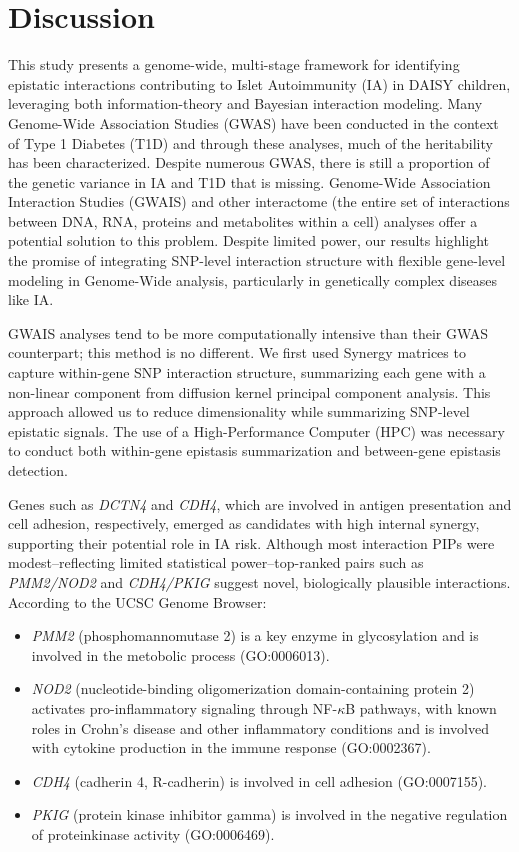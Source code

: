 \documentclass{article}\usepackage[]{graphicx}\usepackage[]{color}
\begin{document}
\section{Discussion}
\label{sec:disc}
This study presents a genome-wide, multi-stage framework for identifying epistatic interactions contributing to Islet Autoimmunity (IA) in DAISY children, leveraging both information-theory and Bayesian interaction modeling. Many Genome-Wide Association Studies (GWAS) have been conducted in the context of Type 1 Diabetes (T1D) and through these analyses, much of the heritability has been characterized. Despite numerous GWAS, there is still a proportion of the genetic variance in IA and T1D that is missing\cite{pangMissingHeritabilityType2022}. Genome-Wide Association Interaction Studies (GWAIS) and other interactome (the entire set of interactions between DNA, RNA, proteins and metabolites within a cell\cite{walakiraDetectingGeneGene2022}) analyses offer a potential solution to this problem. Despite limited power, our results highlight the promise of integrating SNP-level interaction structure with flexible gene-level modeling in Genome-Wide analysis, particularly in genetically complex diseases like IA. 
\par
GWAIS analyses tend to be more computationally intensive than their GWAS counterpart; this method is no different. We first used Synergy matrices to capture within-gene SNP interaction structure, summarizing each gene with a non-linear component from diffusion kernel principal component analysis. This approach allowed us to reduce dimensionality while summarizing SNP-level epistatic signals. The use of a High-Performance Computer (HPC) was necessary to conduct both within-gene epistasis summarization and between-gene epistasis detection. 
\par
Genes such as \textit{DCTN4} and \textit{CDH4}, which are involved in antigen presentation and cell adhesion, respectively, emerged as candidates with high internal synergy, supporting their potential role in IA risk. Although most interaction PIPs were modest--reflecting limited statistical power--top-ranked pairs such as \textit{PMM2/NOD2} and \textit{CDH4/PKIG} suggest novel, biologically plausible interactions. According to the UCSC Genome Browser:
\begin{itemize}
\item \textit{PMM2} (phosphomannomutase 2) is a key enzyme in glycosylation and is involved in the metobolic process (GO:0006013).
\item	\textit{NOD2} (nucleotide-binding oligomerization domain-containing protein 2) activates pro-inflammatory signaling through NF-$\kappa$B pathways, with known roles in Crohn’s disease and other inflammatory conditions and is involved with cytokine production in the immune response (GO:0002367).
\item \textit{CDH4} (cadherin 4, R-cadherin) is involved in cell adhesion (GO:0007155). 
\item \textit{PKIG} (protein kinase inhibitor gamma) is involved in the negative regulation of proteinkinase activity (GO:0006469).
\end{itemize}
\end{document}
